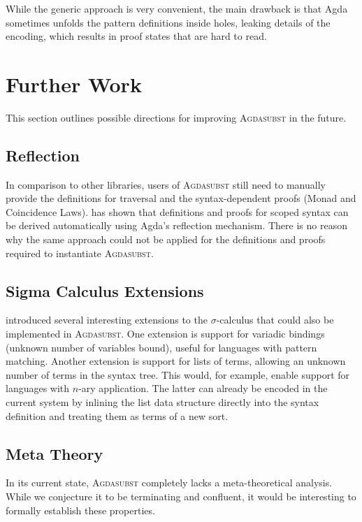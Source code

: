 \documentclass[screen,nonacm]{acmart}
\begin{document}
\noindent\begin{minipage}[t]{0.48\linewidth}
      \raggedright{}
      \GDescL{}
\end{minipage}
\begin{minipage}[t]{0.48\linewidth}
      \raggedright{}
      \GPattern{}
\end{minipage}

\noindent While the
generic approach is very convenient, the main drawback is that Agda sometimes
unfolds the pattern definitions inside holes, leaking details of the encoding,
which results in proof states that are hard to read.

\section{Further Work}\label{sec:wrk}
This section outlines possible directions for improving \textsc{Agdasubst} in
the future.

\subsection*{Reflection}
In comparison to other libraries, users of \textsc{Agdasubst} still need to
manually provide the definitions for traversal and the syntax-dependent proofs
(Monad and Coincidence Laws). \citet{saffrich:LIPIcs.ITP.2024.32} has shown
that definitions and proofs for scoped syntax can be derived automatically
using Agda's reflection mechanism. There is no reason why the same approach
could not be applied for the definitions and proofs required to instantiate
\textsc{Agdasubst}.

\subsection*{Sigma Calculus Extensions}
\citet{Stark:2020:Mechanising} introduced several interesting extensions to the $σ$-calculus that could also be implemented in \textsc{Agdasubst}. One extension is support for variadic bindings (unknown number of variables bound), useful for languages with pattern matching. Another extension is support for lists of terms, allowing an unknown number of terms in the syntax tree. This would, for example, enable support for languages with $n$-ary application.
The latter can already be encoded in the current system by inlining the list
data structure directly into the syntax definition and treating
them as terms of a new sort.

\subsection*{Meta Theory}
In its current state, \textsc{Agdasubst} completely lacks a meta-theoretical
analysis. While we conjecture it to be terminating and confluent, it would be
interesting to formally establish these properties.
\end{document}
